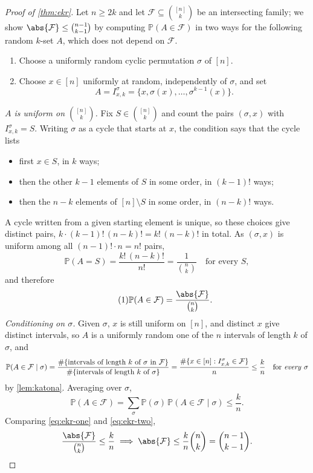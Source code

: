 \begin{proof}[Proof of \autoref{thm:ekr}]
    Let \(n \ge 2k\) and let \(\mathcal{F} \subseteq \binom{[n]}{k}\) be an intersecting family; we show \(\abs{\mathcal{F}} \le \binom{n-1}{k-1}\) by computing \(\mathbb{P}(A \in \mathcal{F})\) in two ways for the following random \(k\)-set \(A\), which does not depend on \(\mathcal{F}\).
    \begin{enumerate}[(1)]
        \item Choose a uniformly random cyclic permutation \(\sigma\) of \([n]\).
        \item Choose \(x \in [n]\) uniformly at random, independently of \(\sigma\), and set
        \[
            A = I_{x,k}^\sigma = \{x, \sigma(x), \ldots, \sigma^{k-1}(x)\}.
        \]
    \end{enumerate}
    \emph{\(A\) is uniform on \(\binom{[n]}{k}\).} Fix \(S \in \binom{[n]}{k}\) and count the pairs \((\sigma, x)\) with \(I_{x,k}^\sigma = S\). Writing \(\sigma\) as a cycle that starts at \(x\), the condition says that the cycle lists
    \begin{itemize}
        \item first \(x \in S\), in \(k\) ways;
        \item then the other \(k-1\) elements of \(S\) in some order, in \((k-1)!\) ways;
        \item then the \(n-k\) elements of \([n] \setminus S\) in some order, in \((n-k)!\) ways.
    \end{itemize}
    A cycle written from a given starting element is unique, so these choices give distinct pairs, \(k \cdot (k-1)! \, (n-k)! = k! \, (n-k)!\) in total. As \((\sigma, x)\) is uniform among all \((n-1)! \cdot n = n!\) pairs,
    \[
        \mathbb{P}(A = S) = \frac{k! \, (n-k)!}{n!} = \frac{1}{\binom{n}{k}} \quad \text{for every } S,
    \]
    and therefore
    \begin{equation}\tag{1}\label{eq:ekr-one}
        \mathbb{P}(A \in \mathcal{F}) = \frac{\abs{\mathcal{F}}}{\binom{n}{k}}.
    \end{equation}
    \emph{Conditioning on \(\sigma\).} Given \(\sigma\), \(x\) is still uniform on \([n]\), and distinct \(x\) give distinct intervals, so \(A\) is a uniformly random one of the \(n\) intervals of length \(k\) of \(\sigma\), and
    \[
        \mathbb{P}(A \in \mathcal{F} \mid \sigma) = \frac{\#\{\text{intervals of length } k \text{ of } \sigma \text{ in } \mathcal{F}\}}{\#\{\text{intervals of length } k \text{ of } \sigma\}} = \frac{\#\{x \in [n] : I_{x,k}^\sigma \in \mathcal{F}\}}{n} \le \frac{k}{n}
        \quad \text{for \emph{every} } \sigma
    \]
    by \autoref{lem:katona}. Averaging over \(\sigma\),
    \begin{equation}\tag{2}\label{eq:ekr-two}
        \mathbb{P}(A \in \mathcal{F}) = \sum_{\sigma} \mathbb{P}(\sigma) \, \mathbb{P}(A \in \mathcal{F} \mid \sigma) \le \frac{k}{n}.
    \end{equation}
    Comparing \eqref{eq:ekr-one} and \eqref{eq:ekr-two},
    \[
        \frac{\abs{\mathcal{F}}}{\binom{n}{k}} \le \frac{k}{n}
        \implies \abs{\mathcal{F}} \le \frac{k}{n} \binom{n}{k} = \binom{n-1}{k-1}. \qedhere
    \]
\end{proof}

